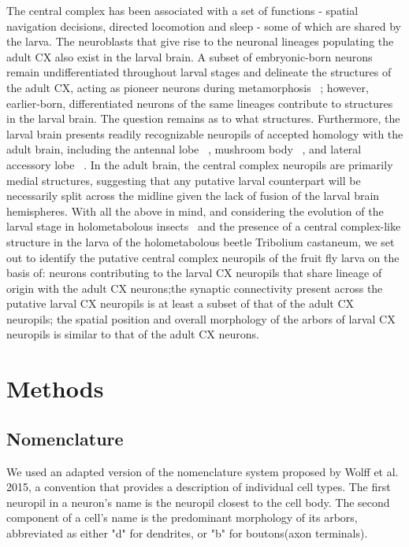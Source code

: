 \documentclass{article}
\begin{document}
The central complex has been associated with a set of functions - spatial navigation decisions, directed locomotion and sleep - some of which are shared by the larva. The neuroblasts that give rise to the neuronal lineages populating the adult CX also exist in the larval brain. A subset of embryonic-born neurons remain undifferentiated throughout larval stages and delineate the structures of the adult CX, acting as pioneer neurons during metamorphosis 
~\citep{andrade2019developmentally}; however, earlier-born, differentiated neurons of the same lineages contribute to structures in the larval brain. The question remains as to what structures. Furthermore, the larval brain presents readily recognizable neuropils of accepted homology with the adult brain, including the antennal lobe ~\citep{berck2016wiring}, mushroom body ~\citep{eichler2017complete}, and lateral accessory lobe ~\citep{hartenstein2015lineage}.
 In the adult brain, the central complex neuropils are primarily medial structures, suggesting that any putative larval counterpart will be necessarily split across the midline given the lack of fusion of the larval brain hemispheres. With all the above in mind, and considering the evolution of the larval stage in holometabolous insects ~\citep{truman1999origins}and the presence of a central complex-like structure in the larva of the holometabolous beetle Tribolium castaneum, we set out to identify the putative central complex neuropils of the fruit fly larva on the basis of: neurons contributing to the larval CX neuropils that share lineage of origin with the adult CX neurons;the synaptic connectivity present across the putative larval CX neuropils is at least a subset of that of the adult CX neuropils; the spatial position and overall morphology of the arbors of larval CX neuropils is similar to that of the adult CX neurons. 


\section{Methods}
 \subsection{Nomenclature}
 We used an adapted version of the nomenclature system proposed by Wolff et al. 2015, a convention that provides a description of individual cell types. The first neuropil in a neuron’s name is the neuropil closest to the cell body. The second component of a cell’s name is the predominant morphology of its arbors, abbreviated as either "d" for dendrites, or "b" for boutons(axon terminals). 
 
\end{document}
